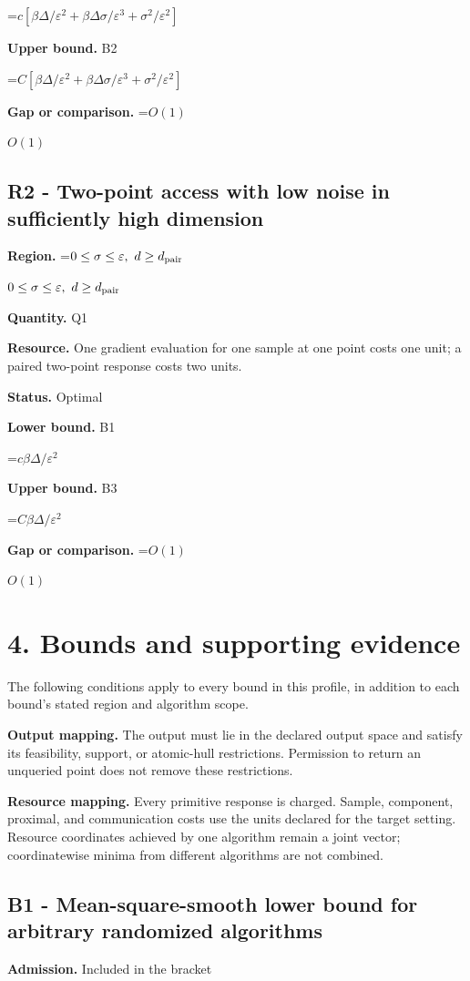 \documentclass[10pt,a4paper]{article}
\newcommand{\AtlasMath}[1]{\par\begingroup\centering\setbox0=\hbox{$\displaystyle #1$}\ifdim\wd0>1.4\linewidth\typeout{ATLAS WIDE FORMULA: \the\wd0}\fi\ifdim\wd0>\linewidth\resizebox{\linewidth}{!}{\box0}\else\box0\fi\par\endgroup}
\newcommand{\AtlasInlineMath}[1]{\begingroup\setbox0=\hbox{$#1$}\ifdim\wd0>.4\linewidth\endgroup\AtlasMath{#1}\else\endgroup$#1$\fi}
\begin{document}
\AtlasMath{c[\beta\Delta/\varepsilon^2+\beta\Delta\sigma/\varepsilon^3+\sigma^2/\varepsilon^2]}
\textbf{Upper bound.} B2

\AtlasMath{C[\beta\Delta/\varepsilon^2+\beta\Delta\sigma/\varepsilon^3+\sigma^2/\varepsilon^2]}
\textbf{Gap or comparison.} \AtlasInlineMath{O(1)}

\subsection{R2 - Two-point access with low noise in sufficiently high dimension}
\textbf{Region.} \AtlasInlineMath{0\le\sigma\le\varepsilon,\ d\ge d_{\rm pair}}

\textbf{Quantity.} Q1

\textbf{Resource.} One gradient evaluation for one sample at one point costs one unit; a paired two-point response costs two units.

\textbf{Status.} Optimal

\textbf{Lower bound.} B1

\AtlasMath{c\beta\Delta/\varepsilon^2}
\textbf{Upper bound.} B3

\AtlasMath{C\beta\Delta/\varepsilon^2}
\textbf{Gap or comparison.} \AtlasInlineMath{O(1)}

\section{4. Bounds and supporting evidence}
The following conditions apply to every bound in this profile, in addition to each bound's stated region and algorithm scope.

\textbf{Output mapping.} The output must lie in the declared output space and satisfy its feasibility, support, or atomic-hull restrictions. Permission to return an unqueried point does not remove these restrictions.

\textbf{Resource mapping.} Every primitive response is charged. Sample, component, proximal, and communication costs use the units declared for the target setting. Resource coordinates achieved by one algorithm remain a joint vector; coordinatewise minima from different algorithms are not combined.

\subsection{B1 - Mean-square-smooth lower bound for arbitrary randomized algorithms}
\textbf{Admission.} Included in the bracket
\end{document}
